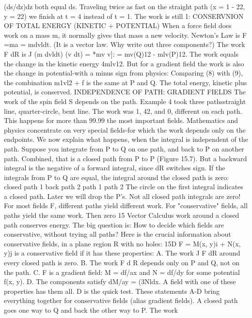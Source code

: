 (ds/dz)dz both equal ds. Traveling twice as fast on the straight path (x = 1 - 22,
y = 22) we finish at t = 4 instead of t = 1. The work is still 1:
CONSERVNION OF TOTAL ENERGY (KINETIC + POTENTIAL)
When a force field does work on a mass m, it normally gives that mass a new velocity.
Newton's Law is F =ma = mdvldt. (It is a vector law. Why write out three components?)
The work F dR is
J (m dvldt) (v dt) = *mv v]: = mv(Q)12 - mlv(P)12.
The work equals the change in the kinetic energy 4mlv12. But for a gradient field the
work is also the change in potential-with a minus sign from physics:
Comparing (8) with (9), the combination m1vl2 + f is the same at P and Q. The total
energy, kinetic plus potential, is conserved.
INDEPENDENCE OF PATH: GRADIENT FIELDS
The work of the spin field S depends on the path. Example 4 took three pathsstraight
line, quarter-circle, bent line. The work was 1, 42, and 0, different on each
path. This happens for more than 99.99%
the most important fields. Mathematics and physics concentrate on very special
fields-for which the work depends only on the endpoints. We now explain what
happens, when the integral is independent of the path.
Suppose you integrate from P to Q on one path, and back to P on another path.
Combined, that is a closed path from P to P (Figure 15.7). But a backward integral
is the negative of a forward integral, since dR switches sign. If the integrals from P
to Q are equal, the integral around the closed path is zero:
closed path 1 back path 2 path 1 path 2
The circle on the first integral indicates a closed path. Later we will drop the P's.
Not all closed path integrals are zero! For most fields F, different paths yield
different work. For "conservative" fields, all paths yield the same work. Then zero 
15 Vector Calculus
work around a closed path conserves energy. The big question is: How to decide
which fields are conservative, without trying all paths? Here is the crucial information
about conservative fields, in a plane region R with no holes:
15D F = M(x, y)i + N(x, y)j is a conservative field if it has these properties:
A. The work J F dR around every closed path is zero.
B. The work F d R depends only on P and Q, not on the path.
C. F is a gradient field: M = df/ax and N = df/dy for some potential f(x, y).
D. The components satisfy dM/ay = (3Nldx.
A field with one of these properties has them all. D is the quick test.
These statements A-D bring everything together for conservative fields (alias gradient
fields). A closed path goes one way to Q and back the other way to P. The work
